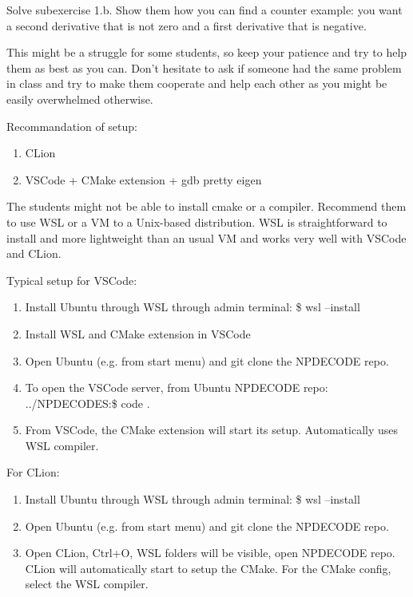 
Solve subexercise 1.b. Show them how you can find a counter example: you want a second derivative that is not zero and a first derivative that is negative.


This might be a struggle for some students, so keep your patience and try to help them as best as you can. Don't hesitate to ask if someone had the same problem in class and try to make them cooperate and help each other as you might be easily overwhelmed otherwise.

Recommandation of setup:
\begin{enumerate}
    \item CLion
    \item VSCode + CMake extension + gdb pretty eigen
\end{enumerate}



The students might not be able to install cmake or a compiler. Recommend them to use WSL or a VM to a Unix-based distribution. WSL is straightforward to install and more lightweight than an usual VM and works very well with VSCode and CLion. 

Typical setup for VSCode:
\begin{enumerate}
    \item Install Ubuntu through WSL through admin terminal: \$ wsl --install
    \item Install WSL and CMake extension in VSCode
    \item Open Ubuntu (e.g. from start menu) and git clone the NPDECODE repo. 
    \item To open the VSCode server, from Ubuntu NPDECODE repo: ../NPDECODES:\$ code . 
    \item From VSCode, the CMake extension will start its setup. Automatically uses WSL compiler.
\end{enumerate}
For CLion:
\begin{enumerate}
    \item Install Ubuntu through WSL through admin terminal: \$ wsl --install
    \item Open Ubuntu (e.g. from start menu) and git clone the NPDECODE repo. 
    \item Open CLion, Ctrl+O, WSL folders will be visible, open NPDECODE repo. CLion will automatically start to setup the CMake. For the CMake config, select the WSL compiler.
\end{enumerate}





